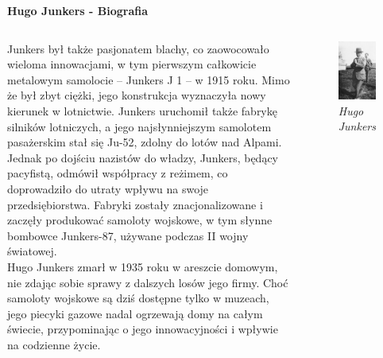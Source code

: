 
\begin{frame}{\Huge{\textbf{Hugo Junkers - Biografia}}}
	\begin{columns}[t]
			\justifying

Junkers był także pasjonatem blachy, co zaowocowało wieloma innowacjami, w tym pierwszym całkowicie metalowym samolocie – Junkers J 1 – w 1915 roku. Mimo że był zbyt ciężki, jego konstrukcja wyznaczyła nowy kierunek w lotnictwie. Junkers uruchomił także fabrykę silników lotniczych, a jego najsłynniejszym samolotem pasażerskim stał się Ju-52, zdolny do lotów nad Alpami. \\
Jednak po dojściu nazistów do władzy, Junkers, będący pacyfistą, odmówił współpracy z reżimem, co doprowadziło do utraty wpływu na swoje przedsiębiorstwa. Fabryki zostały znacjonalizowane i zaczęły produkować samoloty wojskowe, w tym słynne bombowce Junkers-87, używane podczas II wojny światowej. \\
Hugo Junkers zmarł w 1935 roku w areszcie domowym, nie zdając sobie sprawy z dalszych losów jego firmy. Choć samoloty wojskowe są dziś dostępne tylko w muzeach, jego piecyki gazowe nadal ogrzewają domy na całym świecie, przypominając o jego innowacyjności i wpływie na codzienne życie.

			\begin{figure}
				\centering
				\includegraphics[scale=0.5]{images/hugo-02.jpg}
				\caption{\textit{Hugo Junkers}}
			\end{figure}
	\end{columns}
\end{frame}